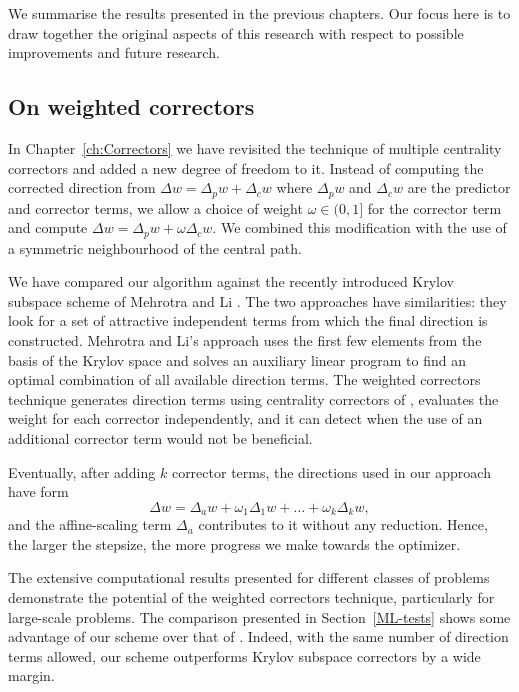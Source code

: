 
%
%
\label{ch:Conclusions}

We summarise the results presented in the previous chapters.
Our focus here is to draw together the original aspects of this research
with respect to possible improvements and future research.


%
%
\subsection*{On weighted correctors}

In Chapter~\ref{ch:Correctors} we have revisited the 
technique of multiple centrality correctors \cite{Gondzio96} 
and added a new degree of freedom to it. 
Instead of computing the corrected direction from 
$\Delta w = \Delta_p w + \Delta_c w$ where 
$\Delta_p w$ and $\Delta_c w$ are the predictor and corrector terms, 
we allow a choice of weight 
$\omega \in (0,1]$ for the corrector term and compute 
$\Delta w = \Delta_p w + \omega \Delta_c w$.
We combined this modification with the use of a symmetric neighbourhood
of the central path. 

We have compared our algorithm against the recently introduced 
Krylov subspace scheme of Mehrotra and Li \cite{MehrotraLi}.
The two approaches have similarities: they look for a set of attractive 
independent terms from which the final direction is constructed. 
Mehrotra and Li's approach uses the first few elements from the basis
of the Krylov space and solves an auxiliary linear program to find an
optimal combination of all available direction terms.
The weighted correctors technique generates direction terms using 
centrality correctors of \cite{Gondzio96}, evaluates the weight
for each corrector independently, and it can detect when the use
of an additional corrector term would not be beneficial.

Eventually, after adding $k$ corrector terms, 
the directions used in our approach have form
\[
  \Delta w = \Delta_a w + \omega_1\Delta_1 w + \ldots + \omega_k\Delta_k w,
\]
and the affine-scaling term $\Delta_a$ contributes to it without any
reduction. Hence, the larger the stepsize, the more progress we make
towards the optimizer.

The extensive computational results presented for different 
classes of problems demonstrate the potential of the
weighted correctors technique, particularly for large-scale problems.
The comparison presented in Section~\ref{ML-tests} 
shows some advantage
of our scheme over that of \cite{MehrotraLi}. Indeed, with the same 
number of direction terms allowed, our scheme outperforms Krylov subspace 
correctors by a wide margin.

